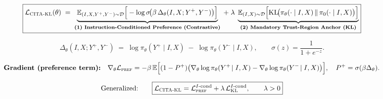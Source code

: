 


\vspace{-0.6em}
\begin{figure}[ht!]
\centering
\begin{tcolorbox}[
  enhanced,
  colback=white,
  colframe=black,
  boxrule=0.8pt,
  borderline={0.6pt}{1.6pt}{black},
  sharp corners,
  width=0.99\textwidth,
  left=3pt,
  right=3pt,
  top=3pt,
  bottom=2pt
]
\tiny

\[
\boxed{
\mathcal{L}_{\textsc{CITA-KL}}(\theta)
\;=\;
\underbrace{
\mathbb{E}_{(I,X,Y^+,Y^-)\sim \mathcal{D}}
\Big[
-\log \sigma\!\big(\beta\,\Delta_\theta(I,X;Y^+,Y^-)\big)
\Big]
}_{\textbf{(1) Instruction-Conditioned Preference (Contrastive)}}
\;+\;
\lambda\;
\underbrace{
\mathbb{E}_{(I,X)\sim \mathcal{D}}
\Big[
\mathrm{KL}\!\big(\pi_\theta(\cdot\mid I,X)\,\|\,\pi_0(\cdot\mid I,X)\big)
\Big]
}_{\textbf{(2) Mandatory Trust-Region Anchor (KL)}}
}
\]

\vspace{-0.5em}

\[
\Delta_\theta(I,X;Y^+,Y^-)
\;=\;
\log \pi_\theta(Y^+\mid I,X)\;-\;\log \pi_\theta(Y^-\mid I,X),
\qquad
\sigma(z)=\frac{1}{1+e^{-z}}.
\]

\vspace{-0.6em}

\[
\textbf{Gradient (preference term):}\quad
\nabla_\theta \mathcal{L}_{\textsc{pref}}
=
-\beta\,
\mathbb{E}\Big[
(1-P^+)\big(\nabla_\theta \log \pi_\theta(Y^+\!\mid I,X)-\nabla_\theta \log \pi_\theta(Y^-\!\mid I,X)\big)
\Big],
\quad
P^+=\sigma(\beta\Delta_\theta).
\]

\vspace{-0.35em}

\[
\text{Generalized:}\qquad
\boxed{
\mathcal{L}_{\textsc{CITA-KL}}
=
\mathcal{L}_{\textsc{pref}}^{I\text{-cond}}
+
\lambda\,\mathcal{L}_{\textsc{KL}}^{I\text{-cond}},
\qquad
\lambda>0
}
\]
\end{tcolorbox}


\end{figure}
